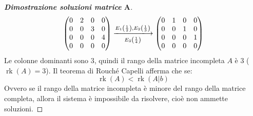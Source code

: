 \documentclass[a4paper]{article}
\makeatletter
\DeclareMathOperator{\rk}{rk}
\newenvironment{rowequmat}[1]{\left(\array{@{}#1@{}}}{\endarray\right)}
\makeatother
\begin{document}
\begin{proof}[\textbf{Dimostrazione soluzioni matrice} $\boldsymbol{A}$]
\begin{gather*}
			\begin{rowequmat}{cccc}
				0 & 2 & 0 & 0 \\
				0 & 0 & 3 & 0 \\
				0 & 0 & 0 & 4 \\
				0 & 0 & 0 & 0
			\end{rowequmat} \xlongrightarrow[E_{3}\left(\frac{1}{4}\right)]{E_{1}\left(\frac{1}{2}\right), E_{2}\left(\frac{1}{3}\right)}
			\begin{rowequmat}{cccc}
				0 & 1 & 0 & 0 \\
				0 & 0 & 1 & 0 \\
				0 & 0 & 0 & 1 \\
				0 & 0 & 0 & 0
			\end{rowequmat}
		\end{gather*}
		Le colonne dominanti sono $3$, quindi il rango della matrice incompleta $A$ è $3$ ($\rk\left(A\right) = 3$). Il teorema di Rouché Capelli afferma che se:
		\begin{equation*}
			\rk\left(A\right) < \rk\left(A|b\right)
		\end{equation*}
		Ovvero se il rango della matrice incompleta è minore del rango della matrice completa, allora il sistema è impossibile da risolvere, cioè non ammette soluzioni.
	\end{proof}\newpage
\end{document}
